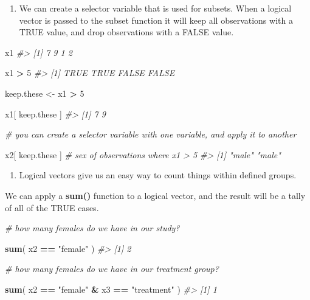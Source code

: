 \documentclass[]{book}
\newenvironment{Shaded}{\begin{snugshade}}{\end{snugshade}}
\newcommand{\CommentTok}[1]{\textcolor[rgb]{0.56,0.35,0.01}{\textit{#1}}}
\newcommand{\DecValTok}[1]{\textcolor[rgb]{0.00,0.00,0.81}{#1}}
\newcommand{\KeywordTok}[1]{\textcolor[rgb]{0.13,0.29,0.53}{\textbf{#1}}}
\newcommand{\NormalTok}[1]{#1}
\newcommand{\OperatorTok}[1]{\textcolor[rgb]{0.81,0.36,0.00}{\textbf{#1}}}
\newcommand{\StringTok}[1]{\textcolor[rgb]{0.31,0.60,0.02}{#1}}
\providecommand{\tightlist}{%
  \setlength{\itemsep}{0pt}\setlength{\parskip}{0pt}}
\theoremstyle{definition}
\theoremstyle{definition}
\theoremstyle{definition}
\theoremstyle{remark}
\begin{document}
\begin{enumerate}
\def\labelenumi{(\arabic{enumi})}
\tightlist
\item
  We can create a selector variable that is used for subsets. When a
  logical vector is passed to the subset function it will keep all
  observations with a TRUE value, and drop observations with a FALSE
  value.
\end{enumerate}

\begin{Shaded}
\begin{Highlighting}[]

\NormalTok{x1}
\CommentTok{#> [1] 7 9 1 2}

\NormalTok{x1 }\OperatorTok{>}\StringTok{ }\DecValTok{5}
\CommentTok{#> [1]  TRUE  TRUE FALSE FALSE}

\NormalTok{keep.these <-}\StringTok{ }\NormalTok{x1 }\OperatorTok{>}\StringTok{ }\DecValTok{5}

\NormalTok{x1[ keep.these ]}
\CommentTok{#> [1] 7 9}

\CommentTok{# you can create a selector variable with one variable, and apply it to another}

\NormalTok{x2[ keep.these ]  }\CommentTok{# sex of observations where x1 > 5}
\CommentTok{#> [1] "male" "male"}
\end{Highlighting}
\end{Shaded}

\begin{enumerate}
\def\labelenumi{(\arabic{enumi})}
\setcounter{enumi}{1}
\tightlist
\item
  Logical vectors give us an easy way to count things within defined
  groups.
\end{enumerate}

We can apply a \textbf{sum()} function to a logical vector, and the
result will be a tally of all of the TRUE cases.

\begin{Shaded}
\begin{Highlighting}[]

\CommentTok{# how many females do we have in our study?}

\KeywordTok{sum}\NormalTok{( x2 }\OperatorTok{==}\StringTok{ "female"}\NormalTok{ )}
\CommentTok{#> [1] 2}

\CommentTok{# how many females do we have in our treatment group?}

\KeywordTok{sum}\NormalTok{( x2 }\OperatorTok{==}\StringTok{ "female"} \OperatorTok{&}\StringTok{ }\NormalTok{x3 }\OperatorTok{==}\StringTok{ "treatment"}\NormalTok{ )}
\CommentTok{#> [1] 1}
\end{Highlighting}
\end{Shaded}
\end{document}
